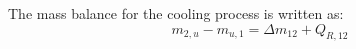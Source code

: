 The mass balance for the cooling process is written as:  
\[
m_{2,u} - m_{u,1} = \Delta m_{12} + Q_{R,12}
\]